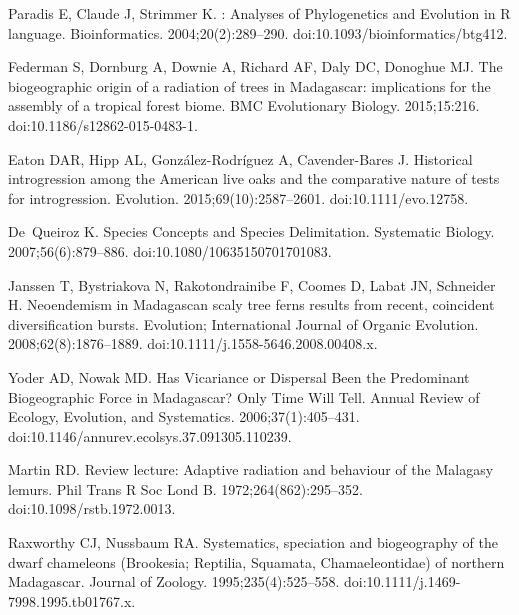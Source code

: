 \documentclass[10pt,letterpaper]{article}
\begin{document}
\begin{thebibliography}{10}
  Paradis E, Claude J, Strimmer K.
  : {Analyses} of {Phylogenetics} and {Evolution} in {R} language.
  \newblock Bioinformatics. 2004;20(2):289--290.
  \newblock doi:{10.1093/bioinformatics/btg412}.

  
  Federman S, Dornburg A, Downie A, Richard AF, Daly DC, Donoghue MJ.
  \newblock The biogeographic origin of a radiation of trees in {Madagascar}:
  implications for the assembly of a tropical forest biome.
  \newblock BMC Evolutionary Biology. 2015;15:216.
  \newblock doi:{10.1186/s12862-015-0483-1}.
  

  Eaton DAR, Hipp AL, González-Rodríguez A, Cavender-Bares J.
  \newblock Historical introgression among the {American} live oaks and the
  comparative nature of tests for introgression.
  \newblock Evolution. 2015;69(10):2587--2601.
  \newblock doi:{10.1111/evo.12758}.
  

  De~Queiroz K.
  \newblock Species {Concepts} and {Species} {Delimitation}.
  \newblock Systematic Biology. 2007;56(6):879--886.
  \newblock doi:{10.1080/10635150701701083}.
  

  Janssen T, Bystriakova N, Rakotondrainibe F, Coomes D, Labat JN, Schneider H.
  \newblock Neoendemism in {Madagascan} scaly tree ferns results from recent,
  coincident diversification bursts.
  \newblock Evolution; International Journal of Organic Evolution.
  2008;62(8):1876--1889.
  \newblock doi:{10.1111/j.1558-5646.2008.00408.x}.
  

  Yoder AD, Nowak MD.
  \newblock Has {Vicariance} or {Dispersal} {Been} the {Predominant}
  {Biogeographic} {Force} in {Madagascar}? {Only} {Time} {Will} {Tell}.
  \newblock Annual Review of Ecology, Evolution, and Systematics.
  2006;37(1):405--431.
  \newblock doi:{10.1146/annurev.ecolsys.37.091305.110239}.
  

  Martin RD.
  \newblock Review lecture: {Adaptive} radiation and behaviour of the {Malagasy}
  lemurs.
  \newblock Phil Trans R Soc Lond B. 1972;264(862):295--352.
  \newblock doi:{10.1098/rstb.1972.0013}.
  

  Raxworthy CJ, Nussbaum RA.
  \newblock Systematics, speciation and biogeography of the dwarf chameleons
  ({Brookesia}; {Reptilia}, {Squamata}, {Chamaeleontidae}) of northern
  {Madagascar}.
  \newblock Journal of Zoology. 1995;235(4):525--558.
  \newblock doi:{10.1111/j.1469-7998.1995.tb01767.x}.
  


\end{thebibliography}
\end{document}

